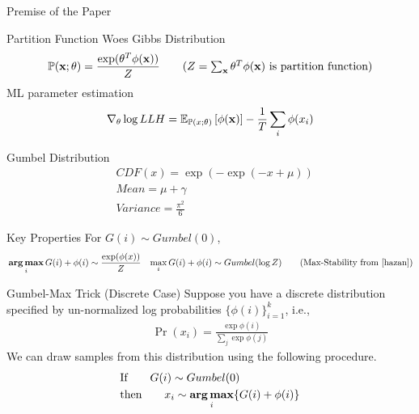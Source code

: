 \begin{frame}{Premise of the Paper}
\end{frame}

\begin{frame}{Partition Function Woes}
  Gibbs Distribution
  \begin{align*}
    \Pr(\x;\theta) =\frac{\exp(\theta^T\phi(\x))}{Z} \tag{$Z=\sum_{\x} \theta^T\phi(\x)$ is partition function}
  \end{align*}
  ML parameter estimation
  \begin{align*}
    \nabla_\theta \log LLH = \operatorname{\mathbb{E}}_{\mathbb{P}(x;\theta)}\left[\phi(\operatorname{\mathbf{x}})\right] - \frac{1}{T} \sum_i\phi(x_i)
  \end{align*}
\end{frame}

\begin{frame}{Gumbel Distribution}
  \begin{align*}  
    & CDF(x) = \exp \left(-\exp\left(-x+\mu\right)\right) \tag{$\mu$ is location parameter} \\
    & Mean = \mu+\gamma \tag{a fixed offset away from location} \\
    & Variance = \frac{\pi^2}{6}
  \end{align*}
\end{frame}

\begin{frame}{Key Properties}
  For $G(i) \sim Gumbel(0)$,
  \begin{align*}
    & \argmax_i{G(i)+\phi(i)} \sim \frac{\exp(\phi(x))}{Z}
    & \max_i{G(i)+\phi(i)} \sim Gumbel(\log Z) \tag{Max-Stability from \cite{hazan}}
  \end{align*}
\end{frame}

\begin{frame}{Gumbel-Max Trick (Discrete Case)}
Suppose you have a discrete distribution specified by un-normalized log probabilities $\{\phi(i)\}_{i=1}^{k}$, i.e.,
  \begin{align*}
    \Pr(x_i) = \frac{\exp\phi(i)}{\sum_j\exp\phi(j)}
  \end{align*}
  We can draw samples from this distribution using the following procedure.
  \begin{align*}
    & \text{If} \qquad G(i) \sim Gumbel(0) \\
    & \text{then} \qquad x_i \sim \operatorname*{\mathbf{arg\,max}}_i \{G(i) +\phi(i)\} 
  \end{align*}
\end{frame}

